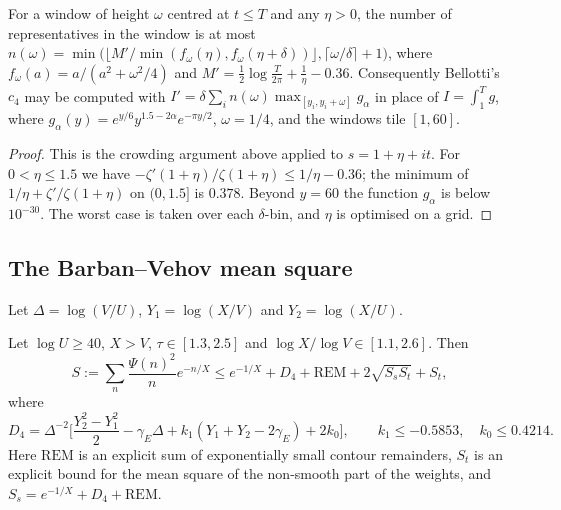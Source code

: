 \begin{lemma}[crowding]\label{lem:crowd}
For a window of height $\omega$ centred at $t \le T$ and any $\eta > 0$, the number of representatives in the window is at most
$n(\omega) = \min\big(\lfloor M'/\min(f_\omega(\eta), f_\omega(\eta+\delta))\rfloor, \lceil \omega/\delta\rceil + 1\big)$,
where $f_\omega(a) = a/(a^2 + \omega^2/4)$ and $M' = \frac12\log\frac T{2\pi} + \frac1\eta - 0.36$.
Consequently Bellotti's $c_4$ \cite[(4.13)--(4.14)]{Bellotti} may be computed with
$I' = \delta\sum_i n(\omega)\max_{[y_i, y_i+\omega]} g_\alpha$ in place of $I = \int_1^T g$, where $g_\alpha(y) = e^{y/6}y^{1.5-2\alpha}e^{-\pi y/2}$, $\omega = 1/4$, and the windows tile $[1,60]$.
\end{lemma}

\begin{proof}
This is the crowding argument above applied to $s = 1+\eta+it$.
For $0 < \eta \le 1.5$ we have $-\zeta'(1+\eta)/\zeta(1+\eta) \le 1/\eta - 0.36$; the minimum of $1/\eta + \zeta'/\zeta(1+\eta)$ on $(0, 1.5]$ is $0.378$.
Beyond $y = 60$ the function $g_\alpha$ is below $10^{-30}$.
The worst case is taken over each $\delta$-bin, and $\eta$ is optimised on a grid.
\end{proof}

\subsection{The Barban--Vehov mean square}
Let $\Delta = \log(V/U)$, $Y_1 = \log(X/V)$ and $Y_2 = \log(X/U)$.

\begin{theorem}\label{thm:G}
Let $\log U \ge 40$, $X > V$, $\tau \in [1.3, 2.5]$ and $\log X/\log V \in [1.1, 2.6]$. Then
\[
S := \sum_n\frac{\Psi(n)^2}{n}e^{-n/X} \le e^{-1/X} + D_4 + \mathrm{REM} + 2\sqrt{S_sS_t} + S_t,
\]
where
\[
D_4 = \Delta^{-2}\Big[\frac{Y_2^2 - Y_1^2}{2} - \gamma_E\Delta + k_1(Y_1+Y_2-2\gamma_E) + 2k_0\Big], \qquad k_1 \le -0.5853,\quad k_0 \le 0.4214 .
\]
Here $\mathrm{REM}$ is an explicit sum of exponentially small contour remainders, $S_t$ is an explicit bound for the mean square of the non-smooth part of the weights, and $S_s = e^{-1/X} + D_4 + \mathrm{REM}$.
\end{theorem}

